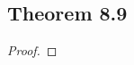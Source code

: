 \documentclass[../../main.tex]{subfiles}
\begin{document}
\subsection{Theorem 8.9}
\begin{wts}

\end{wts}
\begin{proof}

\end{proof}
\end{document}
